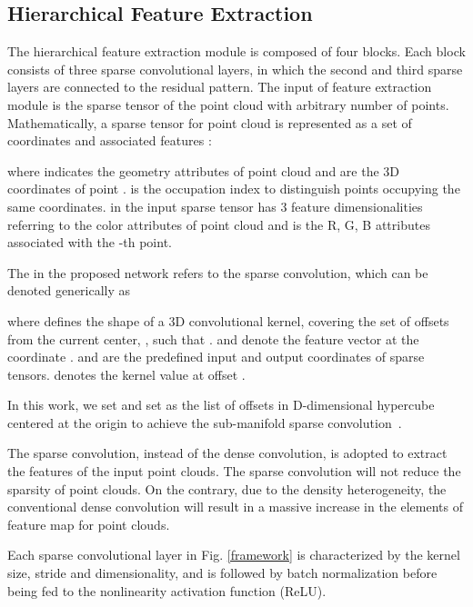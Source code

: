 \documentclass[acmsmall]{acmart}
\begin{document}
\subsection{Hierarchical Feature Extraction}

\par The hierarchical feature extraction module is composed of four blocks. Each block consists of three sparse convolutional layers, in which the second and third sparse layers are connected to the residual pattern. The input of feature extraction module is the sparse tensor of the point cloud with arbitrary number of points. Mathematically, a sparse tensor for point cloud  is represented as a set of coordinates  and associated features :


where  indicates the geometry attributes of point cloud and  are the 3D coordinates of point .  is the occupation index to distinguish points occupying the same coordinates.  in the input sparse tensor has 3 feature dimensionalities referring to the color attributes of point cloud and  is the R, G, B attributes associated with the -th point.

\par The  in the proposed network refers to the sparse convolution, which can be denoted generically as

where  defines the shape of a 3D convolutional kernel, covering the set of offsets from the current center, , such that .  and  denote the feature vector at the coordinate .  and  are the predefined input and output coordinates of sparse tensors.  denotes the kernel value at offset .
\par In this work, we set  and set  as the list of offsets in D-dimensional hypercube centered at the origin to achieve the sub-manifold sparse convolution~\cite{Graham2017Submanifold}.


\par The sparse convolution, instead of the dense convolution, is adopted to extract the features of the input point clouds. The sparse convolution will not reduce the sparsity of point clouds. On the contrary, due to the density heterogeneity, the conventional dense convolution will result in a massive increase in the elements of feature map for point clouds.

\par Each sparse convolutional layer in Fig. \ref{framework} is characterized by the kernel size, stride and dimensionality, and is followed by batch normalization before being fed to the nonlinearity activation function (ReLU).
\end{document}
